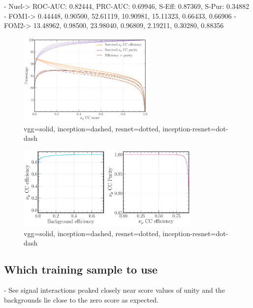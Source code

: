 - Nuel-> ROC-AUC: 0.82444, PRC-AUC: 0.69946, S-Eff: 0.87369, S-Pur: 0.34882
- FOM1-> 0.44448, 0.90500, 52.61119, 10.90981, 15.11323, 0.66433, 0.66906
- FOM2-> 13.48962, 0.98500, 23.98040, 0.96809, 2.19211, 0.30280, 0.88356

\begin{figure} %
    \includegraphics[width=0.6\textwidth]{diagrams/7-cvn/chipsnet/arch_numu_eff_curves.pdf}
    \caption[arch numu eff curves short]
    {vgg=solid, inception=dashed, resnet=dotted, inception-resnet=dot-dash}
    \label{fig:arch_numu_eff_curves}
\end{figure}

\begin{figure} %
    \includegraphics[width=0.8\textwidth]{diagrams/7-cvn/chipsnet/arch_numu_comp_curves.pdf}
    \caption[arch numu comp curves short]
    {vgg=solid, inception=dashed, resnet=dotted, inception-resnet=dot-dash}
    \label{fig:arch_numu_comp_curves}
\end{figure}

\subsection{Which training sample to use} %
\label{sec:cvn_baseline_sample} %

- See signal interactions peaked closely near score values of unity and the backgrounds lie close
to the zero score as expected.

